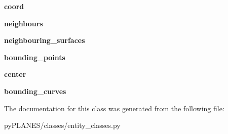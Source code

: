 \begin{DoxyCompactItemize}
{\bfseries coord}
\item 
\mbox{\label{classpy_p_l_a_n_e_s_1_1classes_1_1entity__classes_1_1_gmsh_entity_a625145d010d1afa6fd2882abbee81f0b}} 
{\bfseries neighbours}
\item 
\mbox{\label{classpy_p_l_a_n_e_s_1_1classes_1_1entity__classes_1_1_gmsh_entity_a56bf1430c0a027ef0b4972ef767dce26}} 
{\bfseries neighbouring\+\_\+surfaces}
\item 
\mbox{\label{classpy_p_l_a_n_e_s_1_1classes_1_1entity__classes_1_1_gmsh_entity_a311fc68c956375ff96c16c0ad9c3d577}} 
{\bfseries bounding\+\_\+points}
\item 
\mbox{\label{classpy_p_l_a_n_e_s_1_1classes_1_1entity__classes_1_1_gmsh_entity_a17baa477d344b3d4a43d438f5ad198ec}} 
{\bfseries center}
\item 
\mbox{\label{classpy_p_l_a_n_e_s_1_1classes_1_1entity__classes_1_1_gmsh_entity_a970fca248dddd6f56d0eb466483cb633}} 
{\bfseries bounding\+\_\+curves}
\end{DoxyCompactItemize}


The documentation for this class was generated from the following file\+:\begin{DoxyCompactItemize}
\item 
py\+P\+L\+A\+N\+E\+S/classes/entity\+\_\+classes.\+py\end{DoxyCompactItemize}

